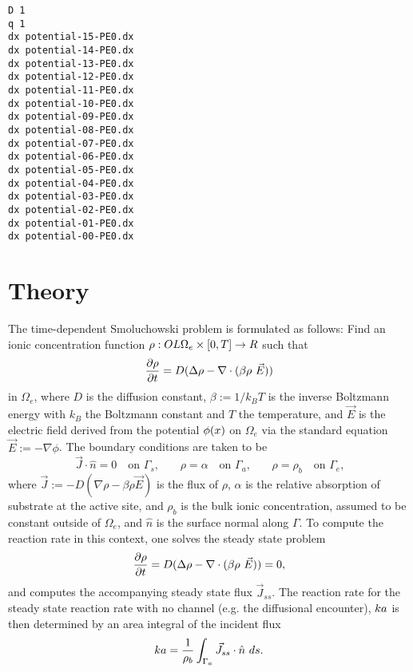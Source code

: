 \documentclass{article}
\begin{document}
\begin{verbatim}
D 1
q 1
dx potential-15-PE0.dx
dx potential-14-PE0.dx
dx potential-13-PE0.dx
dx potential-12-PE0.dx
dx potential-11-PE0.dx
dx potential-10-PE0.dx
dx potential-09-PE0.dx
dx potential-08-PE0.dx
dx potential-07-PE0.dx
dx potential-06-PE0.dx
dx potential-05-PE0.dx
dx potential-04-PE0.dx
dx potential-03-PE0.dx
dx potential-02-PE0.dx
dx potential-01-PE0.dx
dx potential-00-PE0.dx
\end{verbatim}

\newpage
\section{Theory}
\label{theory}
The time-dependent Smoluchowski problem is formulated as follows: Find an ionic concentration function $\rho:OL\Omega_e\times [0,T]\rightarrow R$ such that
\begin{equation}
\label{eq:smol-time-dep}
\frac{\partial\rho}{\partial t} = D(\Delta\rho -\nabla\cdot(\beta\rho~\vec E)) 
\end{equation}
in $\Omega_e$, where $D$ is the diffusion constant, $\beta:=1/k_BT$ is the inverse Boltzmann energy with $k_B$ the Boltzmann constant and $T$ the temperature, and $\vec E$ is the electric field derived from the potential $\phi(x)$ on $\Omega_e$ via the standard equation $\vec E := -\nabla \phi$.
The boundary conditions are taken to be
\begin{equation}
\label{eq:bcs-smol}
\vec J\cdot\hat n = 0 \quad\text{on $\Gamma_s$,}\qquad \rho  = \alpha \quad\text{on $\Gamma_a$,}\qquad \rho = \rho_b \quad\text{on $\Gamma_e$,}
%
%
%
%
\end{equation}
where $\vec J:= -D(\nabla\rho - \beta\rho\vec E)$ is the flux of $\rho$, $\alpha$ is the relative absorption of substrate at the active site, and $\rho_b$ is the bulk ionic concentration, assumed to be constant outside of $\Omega_e$, and $\hat{n}$ is the surface normal along $\Gamma$.
To compute the reaction rate in this context, one solves the steady state problem
\begin{equation}
\label{eq:smol-ss}
\frac{\partial\rho}{\partial t} = D(\Delta\rho -\nabla\cdot(\beta\rho~\vec E)) = 0,
\end{equation}
and computes the accompanying steady state flux $\vec J_{ss}$.
The reaction rate for the steady state reaction rate with no channel (e.g. the diffusional encounter), $ka$ is then determined by an area integral of the incident flux~\cite{Song2004Finite}
\begin{equation}
\label{eq:kss-nc}
ka = \frac 1{\rho_b}\int_{\Gamma_a}\vec J_{ss}\cdot\hat n~ds.
\end{equation}
\end{document}
